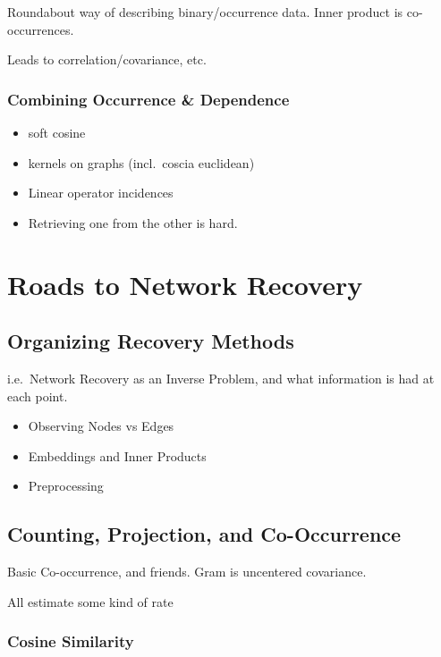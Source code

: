 \documentclass[%
	12pt,
		oneside,
		letterpaper
]{book}
\providecommand{\tightlist}{%
  \setlength{\itemsep}{0pt}\setlength{\parskip}{0pt}}\usepackage{longtable,booktabs,array}
\begin{document}
Roundabout way of describing binary/occurrence data. Inner product is
co-occurrences.

Leads to correlation/covariance, etc.

\subsection{Combining Occurrence \&
Dependence}\label{combining-occurrence-dependence}

\begin{itemize}
\tightlist
\item
  soft cosine
\item
  kernels on graphs (incl.~coscia euclidean)
\item
  Linear operator incidences
\item
  Retrieving one from the other is hard.
\end{itemize}

\chapter{Roads to Network Recovery}\label{sec-lit-review}

\section{Organizing Recovery Methods}\label{organizing-recovery-methods}

i.e.~Network Recovery as an Inverse Problem, and what information is had
at each point.

\begin{itemize}
\tightlist
\item
  Observing Nodes vs Edges
\item
  Embeddings and Inner Products
\item
  Preprocessing
\end{itemize}

\section{Counting, Projection, and
Co-Occurrence}\label{counting-projection-and-co-occurrence}

Basic Co-occurrence, and friends. Gram is uncentered covariance.

All estimate some kind of rate

\subsection{Cosine Similarity}\label{cosine-similarity}
\end{document}
